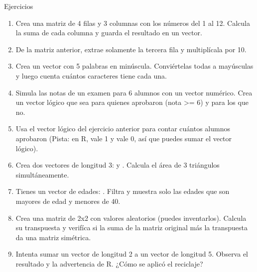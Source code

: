 \documentclass[8pt]{beamer}
\begin{document}
\begin{frame}[fragile]{Ejercicios}	
	\begin{enumerate}[start = 9]
		\item Crea una matriz de 4 filas y 3 columnas con los números del 1 al 12. Calcula la suma de cada columna y guarda el resultado en un vector.
		\item De la matriz anterior, extrae solamente la tercera fila y multiplícala por 10.
		\item Crea un vector con 5 palabras en minúscula. Conviértelas todas a mayúsculas y luego cuenta cuántos caracteres tiene cada una.
		\item Simula las notas de un examen para 6 alumnos con un vector numérico. Crea un vector lógico que sea  para quienes aprobaron (nota >= 6) y  para los que no.
		\item Usa el vector lógico del ejercicio anterior para contar cuántos alumnos aprobaron (Pista: en R,  vale 1 y  vale 0, así que puedes sumar el vector lógico).
		\item Crea dos vectores de longitud 3:  y . Calcula el área de 3 triángulos simultáneamente.
		\item Tienes un vector de edades: . Filtra y muestra solo las edades que son mayores de edad y menores de 40.
		\item Crea una matriz de 2x2 con valores aleatorios (puedes inventarlos). Calcula su transpuesta y verifíca si la suma de la matriz original más la transpuesta da una matriz simétrica.
		\item Intenta sumar un vector de longitud 2 a un vector de longitud 5. Observa el resultado y la advertencia de R. ¿Cómo se aplicó el reciclaje?
	\end{enumerate}
\end{frame}
\end{document}
